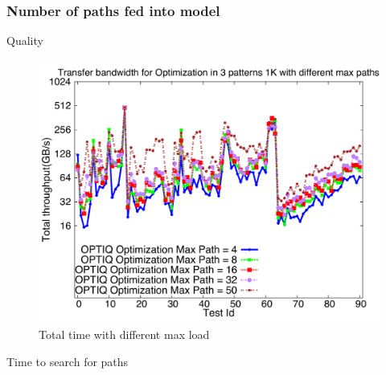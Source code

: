 \subsubsection{Number of paths fed into model}

Quality

\begin{figure}[!htb]
\vspace{-0.1in}
\centering
\includegraphics[scale=0.30]{figures/opt_paths.pdf}
\vspace{-0.1in}
\caption{Total time with different max load}
\vspace{-0.1in}
\label{fig:opt_paths}
\end{figure}

Time to search for paths

